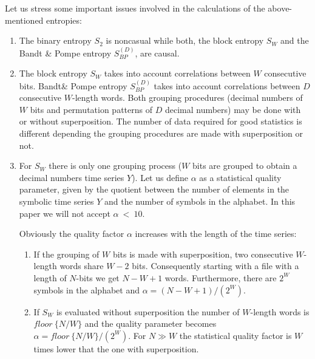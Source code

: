 Let us stress some important issues involved in the calculations of the above-mentioned entropies:
\begin{enumerate}
	\item The binary entropy $S_2$ is noncasual while both, the block entropy $S_W$ and the Bandt \& Pompe entropy $S^{(D)}_{BP}$, are causal. 
	\item The block entropy $S_W$ takes into account correlations between $W$ consecutive bits. Bandt\& Pompe entropy $S^{(D)}_{BP}$ takes into account correlations between $D$ consecutive $W$-length words.
	Both grouping procedures (decimal numbers of $W$ bits and permutation patterns of $D$ decimal numbers) may be done with or without superposition. The number of data required for good statistics is different depending the grouping procedures are made with superposition or not.
	\item For $S_W$ there is only one grouping process ($W$ bits are grouped to obtain a decimal numbers time series $Y$). Let us define $\alpha$ as a statistical quality parameter, given by the quotient between the number of elements in the symbolic time series $Y$ and the number of symbols in the alphabet. In this paper we will not accept $\alpha~<~10$. 
	
	Obviously the quality factor $\alpha$ increases with the length of the time series:
	\begin{enumerate}
		\item If the grouping of $W$ bits is made with superposition, two consecutive $W$-length words share $W-2$ bits. Consequently starting with a file with a length of $N$-bits we get $N-W+1$ words. Furthermore, there are $2^W$ symbols in the alphabet and $\alpha=(N-W+1)/(2^W)$. 
		\item If $S_W$ is evaluated without superposition the number of $W$-length words is $floor~\{N/W\}$ and the quality parameter becomes $\alpha=floor~\{N/W\}/(2^W)$. For $N\gg W$ the statistical quality factor is $W$ times lower that the one with superposition.
	\end{enumerate}
	

\end{enumerate}
